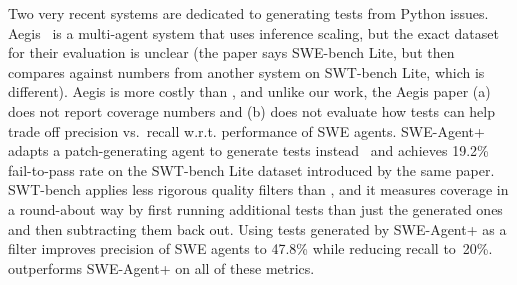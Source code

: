 Two very recent systems are dedicated to generating tests from Python
issues.
Aegis~\cite{aegis} is a multi-agent system that uses inference
scaling, but the exact dataset for their evaluation
is unclear (the paper says SWE-bench Lite, but then compares against
numbers from another system on SWT-bench Lite, which is different).
Aegis is more costly than \soly, and unlike our
work, the Aegis paper (a) does not report coverage numbers and (b) does not evaluate how tests can help trade off precision vs.\ recall w.r.t. performance of SWE agents.
SWE-Agent+ adapts a patch-generating agent to generate tests
instead~\cite{mundler2024swtbench} and achieves 19.2\% fail-to-pass rate on the SWT-bench Lite dataset
introduced by the same paper.
SWT-bench applies less rigorous quality filters than \tdd, and it
measures coverage in a round-about way by first running additional
tests than just the generated ones and then subtracting them back out.
Using tests generated by SWE-Agent+ as a filter improves precision
of SWE agents to 47.8\% while reducing recall to~20\%.
\soly outperforms SWE-Agent+ on all of these metrics.